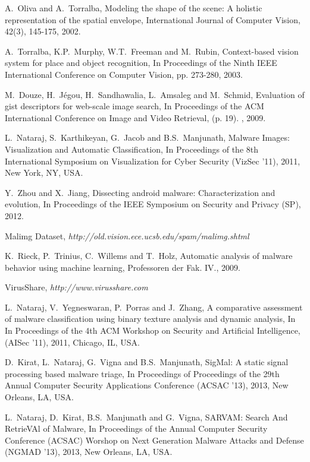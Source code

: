 \documentclass[journal]{IEEEtran}
\begin{document}
\begin{thebibliography}{1}




A.~Oliva and A.~Torralba, Modeling the shape of the scene: A holistic representation of the spatial envelope, International Journal of Computer Vision, 42(3), 145-175, 2002.

A.~Torralba, K.P.~Murphy, W.T.~Freeman and M.~Rubin, Context-based vision system for place and object recognition, In Proceedings of the
Ninth IEEE International Conference on Computer Vision, pp. 273-280, 2003. 

M.~Douze, H.~Jégou, H.~Sandhawalia, L.~Amsaleg and M.~Schmid, Evaluation of gist descriptors for web-scale image search, In Proceedings of the ACM International Conference on Image and Video Retrieval, (p. 19). , 2009. 

L.~Nataraj, S.~Karthikeyan, G.~Jacob and B.S.~Manjunath, Malware Images: Visualization and Automatic Classification, In Proceedings of the 8th International Symposium on Visualization for Cyber Security (VizSec '11), 2011, New York, NY, USA.


Y.~Zhou and X.~Jiang,  Dissecting android malware: Characterization and evolution, In Proceedings of the IEEE Symposium on Security and Privacy (SP), 2012.


Malimg Dataset, {\it http://old.vision.ece.ucsb.edu/spam/malimg.shtml}


K.~Rieck, P.~Trinius, C.~Willems and T.~Holz, Automatic analysis of malware behavior using machine learning, Professoren der Fak. IV., 2009.


VirusShare, {\it http://www.virusshare.com}



L.~Nataraj, V.~Yegneswaran, P.~Porras and J.~Zhang, A comparative assessment of malware classification using binary texture analysis and dynamic analysis, In In Proceedings of the 4th ACM Workshop on Security and Artificial Intelligence, (AISec '11), 2011, Chicago, IL, USA.

D.~Kirat, L.~Nataraj, G.~Vigna and B.S.~Manjunath, SigMal: A static signal processing based malware triage, In Proceedings of Proceedings of the 29th Annual Computer Security Applications Conference (ACSAC '13), 2013, New Orleans, LA, USA.


L.~Nataraj, D.~Kirat, B.S.~Manjunath and G.~Vigna, SARVAM: Search And RetrieVAl of Malware, In Proceedings of the Annual Computer Security Conference (ACSAC) Worshop on Next Generation Malware Attacks and Defense (NGMAD '13), 2013, New Orleans, LA, USA.




\end{thebibliography}
\end{document}
